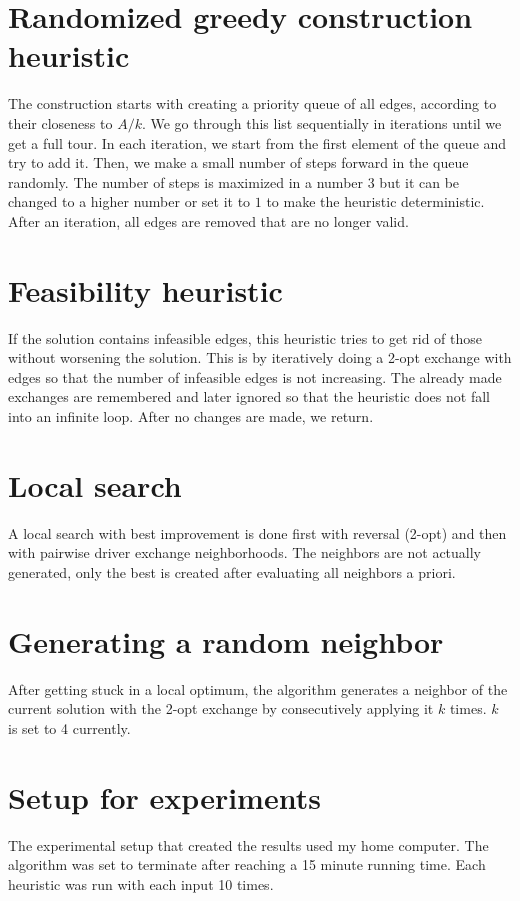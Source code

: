 \documentclass{article}
\begin{document}
\section*{Randomized greedy construction heuristic}
The construction starts with creating a priority queue of all edges, according to their closeness to $A/k$. We go through this list sequentially in iterations until we get a full tour. In each iteration, we start from the first element of the queue and try to add it. Then, we make a small number of steps forward in the queue randomly. The number of steps is maximized in a number $3$ but it can be changed to a higher number or set it to $1$ to make the heuristic deterministic. After an iteration, all edges are removed that are no longer valid.
\section*{Feasibility heuristic}
If the solution contains infeasible edges, this heuristic tries to get rid of those without worsening the solution. This is by iteratively doing a 2-opt exchange with edges so that the number of infeasible edges is not increasing. The already made exchanges are remembered and later ignored so that the heuristic does not fall into an infinite loop. After no changes are made, we return.
\section*{Local search}
A local search with best improvement is done first with reversal (2-opt) and then with pairwise driver exchange neighborhoods. The neighbors are not actually generated, only the best is created after evaluating all neighbors a priori.
\section*{Generating a random neighbor}
After getting stuck in a local optimum, the algorithm generates a neighbor of the current solution with the 2-opt exchange by consecutively applying it $k$ times. $k$ is set to 4 currently.
\section*{Setup for experiments}
The experimental setup that created the results used my home computer. The algorithm was set to terminate after reaching a 15 minute running time. Each heuristic was run with each input 10 times.
\end{document}
